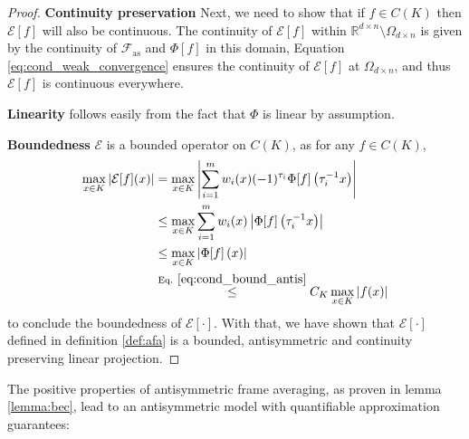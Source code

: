 \documentclass{amsart}
\theoremstyle{plain}
\theoremstyle{definition}
\newtheorem{defn}[theorem]{Definition}
\theoremstyle{remark}
\DeclareMathOperator*{\stab}{Stab}
\newcommand{\RR}{\mathbb{R}}
\newcommand{\abs}[1]{\left\lvert#1\right\rvert}
\begin{document}
\begin{proof}
\textbf{Continuity preservation} Next, we need to show that if $f\in C(K)$ then $\mathcal{E}[f] $ will also be continuous. The continuity of $\mathcal{E}[f]$ within $\RR^{d \times n} \setminus{\Omega_{d \times n}}$ is given by the continuity of $\mathcal{F}_{\text{as}}$ and $\Phi[f]$ in this domain, Equation \eqref{eq:cond_weak_convergence}  ensures the continuity of $\mathcal{E}[f]$ at $\Omega_{d \times n}$, and thus $\mathcal{E}[f]$ is continuous everywhere. 

\textbf{Linearity} follows easily from the fact that $\Phi$ is linear by assumption. 

\textbf{Boundedness} $\mathcal{E}$ is a bounded operator on $C(K)$, as for any $f\in C(K) $,
  \begin{equation} \label{eq:lemma_bec_uni}
    \begin{split}
       \max_{x \in K}{\abs{\mathcal{E}[f](x)}} 
       &= \max_{x \in K}{\abs{\sum_{i=1}^{m}{w_i(x)(-1)^{\tau_i}\Phi[f]\left( \tau_i^{-1} x \right)}}}  \\
    &\leq 
    \max_{x \in K}{\sum_{i=1}^{m}{w_i(x) \abs{\Phi[f]\left( \tau_i^{-1} x \right)}}}  \\ 
 &\leq       \max_{x \in K}{\abs{\Phi[f]\left(x \right)}}
    \\
    &\stackrel{\text{Eq. } \eqref{eq:cond_bound_antis}}{\leq}  C_K \max_{x \in K}{\abs{f(x)}}   
        \end{split}
    \end{equation}
  to conclude the boundedness of $\mathcal{E}[\cdot]$. With that, we have shown that $\mathcal{E}[\cdot]$ defined in definition \ref{def:afa} is a bounded, antisymmetric and continuity preserving linear projection.
\end{proof}
The positive properties of antisymmetric frame averaging, as proven in lemma \ref{lemma:bec}, lead to an antisymmetric model with quantifiable approximation guarantees:
\end{document}
